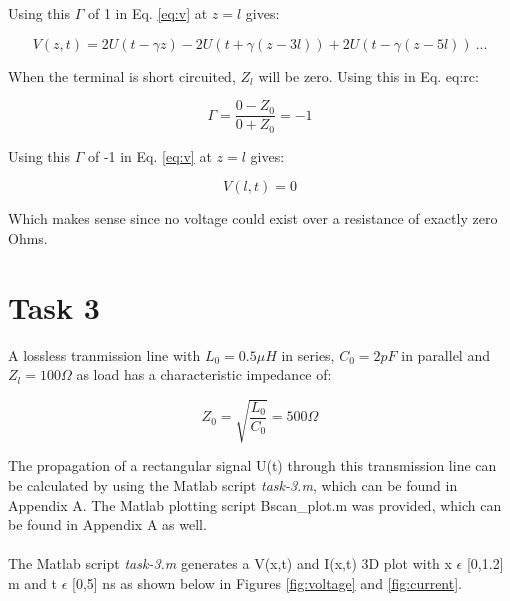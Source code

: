 \documentclass[final]{scrreprt} %
\begin{document}
Using this $\Gamma$ of 1 in Eq. \ref{eq:v} at $z = l$ gives:

\begin{equation}
	V(z,t) = 2U(t - \gamma z) - 2U(t + \gamma(z - 3l)) + 2U(t - \gamma(z - 5l)) ~ ...
\label{eq:v}
\end{equation}

When the terminal is short circuited, $Z_l$ will be zero. Using this in Eq. {eq:rc}:

\begin{equation}
	\Gamma = \frac{0 - Z_0}{0 + Z_0} = -1
\end{equation}

Using this $\Gamma$ of -1 in Eq. \ref{eq:v} at $z = l$ gives:

\begin{equation}
	V(l,t) = 0
\end{equation}

Which makes sense since no voltage could exist over a resistance of exactly zero Ohms.

\section{Task 3}
A lossless tranmission line with $L_0 = 0.5 \mu H$ in series, $C_0 = 2 pF$ in parallel and $Z_l = 100 \Omega$ as load has a characteristic impedance of:

\begin{equation}
	Z_0 = \sqrt{\frac{L_0}{C_0}} = 500 \Omega
\end{equation}

The propagation of a rectangular signal U(t) through this transmission line can be calculated by using the Matlab script \emph{task-3.m}, which can be found in Appendix A. The Matlab plotting script Bscan\_plot.m was provided, which can be found in Appendix A as well.
\\ \\
The Matlab script \emph{task-3.m} generates a V(x,t) and I(x,t) 3D plot with x $\epsilon$ [0,1.2] m and t $\epsilon$ [0,5] ns as shown below in Figures \ref{fig:voltage} and \ref{fig:current}.
\end{document}
